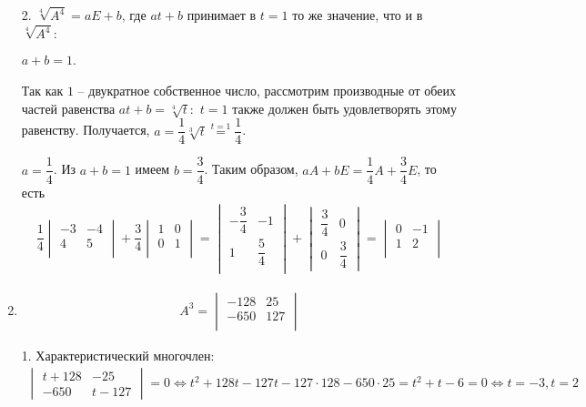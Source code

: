 \begin{enumerate}
				2. $\sqrt[4]{A^{4}} = aE + b$, где $at + b$ принимает в $t = 1$ то же значение, что и в $\sqrt[4]{A^{4}}:$
				
				$a + b = 1$.
				
				Так как $1$ -- двукратное собственное число, рассмотрим производные от обеих частей равенства $at + b = \sqrt[4]{t}:$ $t = 1$ также должен быть удовлетворять этому равенству. Получается, $a = \dfrac{1}{4}\sqrt[3]{t} \overset{t = 1}{=} \dfrac{1}{4}$. 
				
				$a = \dfrac{1}{4}$. Из $a + b = 1$ имеем $b = \dfrac{3}{4}$. Таким образом, $aA + bE = \dfrac{1}{4}A + \dfrac{3}{4}E$, то есть 
				\begin{gather*}
					\dfrac{1}{4} 
					\begin{vmatrix} 
						-3 & -4\\ 
						4 & 5\\
					\end{vmatrix}
					+ \dfrac{3}{4} 
					\begin{vmatrix} 
						1 & 0\\ 
						0 & 1\\ 
					\end{vmatrix}
					= 
					\begin{vmatrix} 
						-\dfrac{3}{4} & -1\\
						1 & \dfrac{5}{4}\\
					\end{vmatrix} 
					+
					\begin{vmatrix}
						\dfrac{3}{4} & 0\\
						0 & \dfrac{3}{4}
					\end{vmatrix}
					= 
					\begin{vmatrix} 
						0 & -1\\
						1 & 2\\
					\end{vmatrix}
				\end{gather*}
			\item
				\begin{gather*}
					A^{3} = 
					\begin{vmatrix}
						-128 & 25\\
						-650 & 127\\
					\end{vmatrix}
				\end{gather*}
				
				1. Характеристический многочлен: 
				\begin{gather*}
					\begin{vmatrix} 
						t + 128 & -25\\
						-650 & t - 127
					\end{vmatrix}
					= 0 \Leftrightarrow
					t^{2} + 128t - 127t - 127 \cdot 128 - 650 \cdot 25 = t^{2} + t - 6 = 0 \Leftrightarrow
					t = -3, t = 2
				\end{gather*}
				

\end{enumerate}
